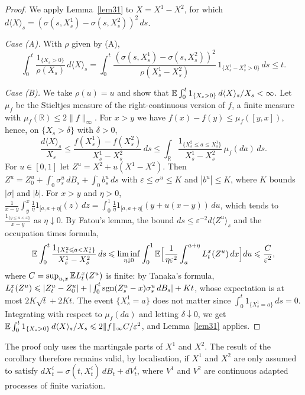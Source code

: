 \begin{proof}
	We apply Lemma~\ref{lem31} to $X=X^1 - X^2$, for which
	$d\langle X\rangle_s = (\sigma (s,X_s^1)-\sigma(s,X_s^2))^2\,ds$.

	\emph{Case (A).} With $\rho$ given by (A),
	\[
		\int_0^t \frac{1_{\{X_s > 0\}}}{\rho(X_s)}\,d\langle X\rangle_s
		= \int_0^t \frac{(\sigma (s,X_s^1)-\sigma(s,X_s^2))^2}{\rho(X_s^1-X_s^2)}\,
		1_{\{X_s^1 - X_s^2 > 0\}}\,ds \leqslant t .
	\]

	\emph{Case (B).} We take $\rho(u)=u$ and show that
	$\mathbb{E}\int_0^t 1_{\{X_s > 0\}}\,d\langle X\rangle_s/X_s < \infty$. Let $\mu_f$ be the
	Stieltjes measure of the right-continuous version of $f$, a finite measure
	with $\mu_f(\mathbb{R})\leqslant 2\|f\|_\infty$. For $x > y$ we have
	$f(x)-f(y)\leqslant \mu_f([y,x])$, hence, on $\{X_s > \delta\}$ with $\delta>0$,
	\[
		\frac{d\langle X\rangle_s}{X_s} \leqslant \frac{f(X^1_s) - f(X^2_s)}{X^1_s - X^2_s}\,ds
		\leqslant \int_\mathbb{R} \frac{1_{\{X^2_s\leqslant a\leqslant X^1_s\}}}{X^1_s - X^2_s}\,\mu_f(da)\,ds .
	\]
	For $u\in[0,1]$ let $Z^u = X^2 + u(X^1 - X^2)$. Then
	$Z^u = Z^u_0 + \int_0^\cdot \sigma^u_s\,dB_s + \int_0^\cdot b^u_s\,ds$ with
	$\varepsilon\leqslant\sigma^u\leqslant K$ and $|b^u|\leqslant K$, where $K$ bounds
	$|\sigma|$ and $|b|$. For $x>y$ and $\eta > 0$,
	$\frac{1}{x-y}\int_y^x \frac{1}{\eta}1_{[a,a+\eta[}(z)\,dz =
		\int_0^1 \frac{1}{\eta}1_{[a,a+\eta[}(y+u(x-y))\,du$, which tends to
	$\frac{1_{\{y\leqslant a < x\}}}{x-y}$ as $\eta\downarrow 0$. By Fatou's lemma, the
	bound $ds \leqslant \varepsilon^{-2}d\langle Z^u\rangle_s$ and the occupation
	times formula,
	\[
		\mathbb{E}\int_0^t \frac{1_{\{X^2_s\leqslant a < X^1_s\}}}{X^1_s - X^2_s}\,ds
		\leqslant \liminf_{\eta\downarrow 0}\int_0^1 \mathbb{E}\Big[\frac{1}{\eta\varepsilon^2}\int_a^{a+\eta} L^x_t(Z^u)\,dx\Big]du
		\leqslant \frac{C}{\varepsilon^2},
	\]
	where $C = \sup_{u,x}\mathbb{E} L^x_t(Z^u)$ is finite: by Tanaka's formula,
	$L^x_t(Z^u) \leqslant |Z^u_t - Z^u_0| + |\int_0^t \operatorname{sgn}(Z^u_s - x)\sigma^u_s\,dB_s| + Kt$,
	whose expectation is at most $2K\sqrt{t} + 2Kt$. The event $\{X^1_s = a\}$ does not
	matter since $\int_0^t 1_{\{X^1_s = a\}}\,ds = 0$. Integrating with respect to
	$\mu_f(da)$ and letting $\delta\downarrow 0$, we get
	$\mathbb{E}\int_0^t 1_{\{X_s > 0\}}\,d\langle X\rangle_s/X_s \leqslant 2\|f\|_\infty C/\varepsilon^2$,
	and Lemma~\ref{lem31} applies.
\end{proof}

\begin{remark}
	The proof only uses the martingale parts of $X^1$ and $X^2$. The result of the
	corollary therefore remains valid, by localisation, if $X^1$ and $X^2$ are only
	assumed to satisfy $dX_t^i=\sigma (t,X_t^i)\,dB_t + dV_t^i$, where $V^1$ and $V^2$
	are continuous adapted processes of finite variation.
\end{remark}

